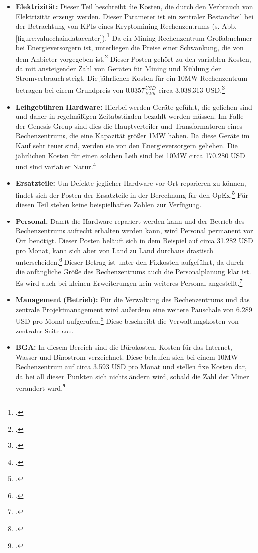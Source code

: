 \begin{itemize}
    \item \textbf{Elektrizität: }Dieser Teil beschreibt die Kosten, die durch den Verbrauch von Elektrizität erzeugt werden.
    Dieser Parameter ist ein zentraler Bestandteil bei der Betrachtung von \acp{KPI} eines Kryptomining Rechenzentrums
    (s. Abb. \ref{figure:valuechaindatacenter}).\footcite[Vgl.][S. 327]{derks2018chaining} Da ein Mining Rechenzentrum
    Großabnehmer bei Energieversorgern ist, unterliegen die Preise einer Schwankung, die von dem Anbieter vorgegeben
    ist.\footcite[Vgl.][]{appendix:opex} Dieser Posten gehört zu den variablen Kosten, da mit ansteigender Zahl von Geräten
    für Mining und Kühlung der Stromverbrauch steigt. Die jährlichen Kosten für ein 10MW Rechenzentrum betragen bei einem
    Grundpreis von $0.0357 \frac{USD}{kWh}$ circa 3.038.313 USD.\footcite[Vgl.][]{appendix:opex}
    \item \textbf{Leihgebühren Hardware: }Hierbei werden Geräte geführt, die geliehen sind und daher in regelmäßigen
    Zeitabständen bezahlt werden müssen. Im Falle der Genesis Group sind dies die Hauptverteiler und Transformatoren
    eines Rechenzentrums, die eine Kapazität größer 1MW haben. Da diese Geräte im Kauf sehr teuer sind, werden sie von
    den Energieversorgern geliehen. Die jährlichen Kosten für einen solchen Leih sind bei 10MW circa 170.280 USD
    und sind variabler Natur.\footcite[Vgl.][]{appendix:opex}
    \item \textbf{Ersatzteile: }Um Defekte jeglicher Hardware vor Ort reparieren zu können, findet sich der Posten der
    Ersatzteile in der Berechnung für den \ac{OpEx}.\footcite[Vgl.][S. 327]{derks2018chaining} Für diesen Teil stehen
    keine beispielhaften Zahlen zur Verfügung.
    \item \textbf{Personal: }Damit die Hardware repariert werden kann und der Betrieb des Rechenzentrums aufrecht erhalten
    werden kann, wird Personal permanent vor Ort benötigt. Dieser Posten beläuft sich in dem Beispiel auf circa
    31.282 USD pro Monat, kann sich aber von Land zu Land durchaus drastisch unterscheiden.\footcite[Vgl.][]{appendix:opex}
    Dieser Betrag ist unter den Fixkosten aufgeführt, da durch die anfängliche Größe des Rechenzentrums auch die Personalplanung
    klar ist. Es wird auch bei kleinen Erweiterungen kein weiteres Personal angestellt.\footcite[Vgl.][]{appendix:opex}
    \item \textbf{Management (Betrieb): }Für die Verwaltung des Rechenzentrums und das zentrale Projektmanagement wird
    außerdem eine weitere Pauschale von 6.289 USD pro Monat aufgerufen.\footcite[Vgl.][]{appendix:opex} Diese beschreibt
    die Verwaltungskosten von zentraler Seite aus.
    \item \textbf{\ac{BGA}: }In diesem Bereich sind die Bürokosten, Kosten für das Internet, Wasser und Bürostrom verzeichnet.
    Diese belaufen sich bei einem 10MW Rechenzentrum auf circa 3.593 USD pro Monat und stellen fixe Kosten dar, da bei all diesen
    Punkten sich nichts ändern wird, sobald die Zahl der Miner verändert wird.\footcite[Vgl.][]{appendix:opex}
\end{itemize}

